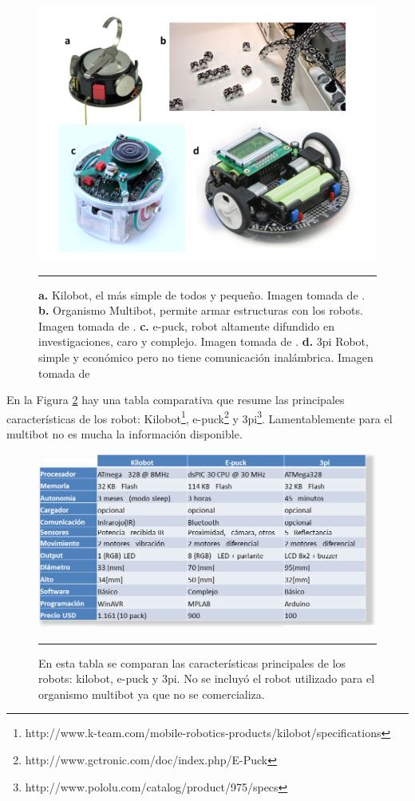 \begin{figure}[htbp]
	\centering
		\includegraphics[width=\textwidth]{./Figures/robots1.png}
		\rule{35em}{0.5pt} 
	\caption[Robots estudiados como alternativa para armar un enjambre de robots.]{\textbf{a.} Kilobot, el más simple de todos y pequeño. Imagen tomada de \cite{6224638}. \textbf{b.} Organismo Multibot, permite armar estructuras con los robots. Imagen tomada de \cite{5359578}. \textbf{c.} e-puck, robot altamente difundido en investigaciones, caro y complejo. Imagen tomada de \cite{mondada2009puck}. \textbf{d.} 3pi Robot, simple y económico pero no tiene comunicación inalámbrica. Imagen tomada de \cite{thurskyusing}}
	\label{fig:robots estudiados}
\end{figure}

En la Figura \ref{fig:Tabla robots} hay una tabla comparativa que resume las principales características de los robot: Kilobot\footnote{http://www.k-team.com/mobile-robotics-products/kilobot/specifications}, e-puck\footnote{http://www.gctronic.com/doc/index.php/E-Puck} y 3pi\footnote{http://www.pololu.com/catalog/product/975/specs}. Lamentablemente para el multibot no es mucha la información disponible.

\begin{figure}[htbp]
	\centering
		\includegraphics[width=1\textwidth]{./Figures/tabla_robots.png}
		\rule{35em}{0.5pt}
	\caption[Tabla comparativa robots]{En esta tabla se comparan las características principales de los robots: kilobot, e-puck y 3pi. No se incluyó el robot utilizado para el organismo multibot ya que no se comercializa.}
	\label{fig:Tabla robots}
\end{figure}

